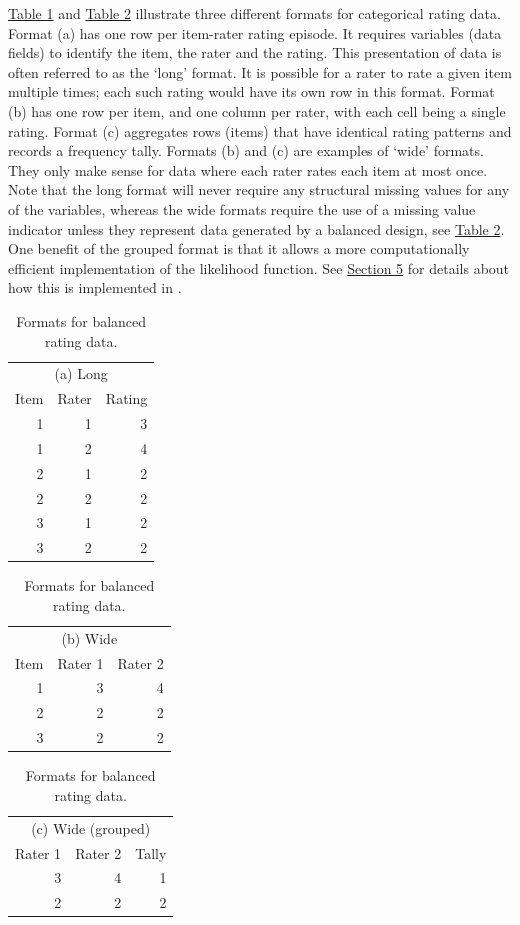 \protect\hyperlink{tab:data-formats-balanced}{Table 1} and \protect\hyperlink{tab:data-formats-unbalanced}{Table 2}
illustrate three different formats for categorical rating data. Format
(a) has one row per item-rater rating episode. It requires variables
(data fields) to identify the item, the rater and the rating. This
presentation of data is often referred to as the `long' format. It is
possible for a rater to rate a given item multiple times; each such
rating would have its own row in this format. Format (b) has one row per
item, and one column per rater, with each cell being a single rating.
Format (c) aggregates rows (items) that have identical rating patterns
and records a frequency tally. Formats (b) and (c) are examples of
`wide' formats. They only make sense for data where each rater rates
each item at most once. Note that the long format will never require
any structural missing values for any of the variables, whereas the wide formats
require the use of a missing value indicator unless they represent data
generated by a balanced design, see \protect\hyperlink{tab:data-formats-unbalanced}{Table 2}.
One benefit of the grouped format is that it allows a more
computationally efficient implementation of the likelihood function. See
\protect\hyperlink{sec:implementation}{Section 5} for details about how this is implemented in
.

\begin{table}
\caption{\label{tab:data-formats-balanced}Formats for balanced rating data.}

\begin{tabular}[t]{rrr}
\toprule
\multicolumn{3}{c}{(a) Long} \\
\cmidrule(l{3pt}r{3pt}){1-3}
Item & Rater & Rating\\
\midrule
1 & 1 & 3\\
1 & 2 & 4\\
2 & 1 & 2\\
2 & 2 & 2\\
3 & 1 & 2\\
3 & 2 & 2\\
\bottomrule
\end{tabular}
\begin{tabular}[t]{rrr}
\toprule
\multicolumn{3}{c}{(b) Wide} \\
\cmidrule(l{3pt}r{3pt}){1-3}
Item & Rater 1 & Rater 2\\
\midrule
1 & 3 & 4\\
2 & 2 & 2\\
3 & 2 & 2\\
\bottomrule
\end{tabular}
\begin{tabular}[t]{rrr}
\toprule
\multicolumn{3}{c}{(c) Wide (grouped)} \\
\cmidrule(l{3pt}r{3pt}){1-3}
Rater 1 & Rater 2 & Tally\\
\midrule
3 & 4 & 1\\
2 & 2 & 2\\
\bottomrule
\end{tabular}
\end{table}

